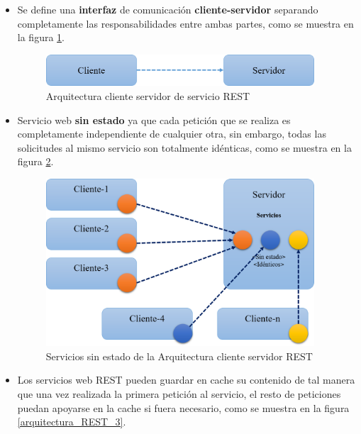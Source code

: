 \begin{itemize}
    \item Se define una \textbf{interfaz} de comunicaci\'on \textbf{cliente-servidor} separando completamente las responsabilidades entre ambas partes, como se muestra en la figura \ref{arquitectura_REST_1}.
    
    \begin{figure}[!ht]
    	\centering
    	\includegraphics[width=10cm]{figures/ClienteServidorREST.png} %
        \caption{Arquitectura cliente servidor de servicio REST} %
        \label{arquitectura_REST_1}
    \end{figure}
    
    \item Servicio web \textbf{sin estado} ya que  cada petici\'on que se realiza es completamente independiente de cualquier otra, sin embargo, todas las solicitudes al mismo servicio son totalmente id\'enticas, como se muestra en la figura \ref{arquitectura_REST_2}.
    
    \begin{figure}[!ht]
    	\centering
    	\includegraphics[width=10cm]{figures/ClienteServidorREST2.png} %
        \caption{Servicios sin estado de la Arquitectura cliente servidor REST} %
        \label{arquitectura_REST_2}
    \end{figure}
    
    \item Los servicios web REST pueden guardar en cache su contenido de tal manera que una vez realizada la primera petici\'on al servicio, el resto de peticiones puedan apoyarse en la cache si fuera necesario, como se muestra en la figura \ref{arquitectura_REST_3}.
    

\end{itemize}
